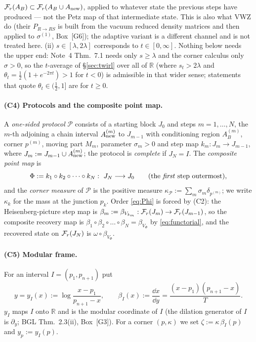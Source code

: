 \documentclass[11pt]{article}
\newcommand{\bI}{\beta_I}
\newcommand{\Fr}{\cF_r}
\newcommand{\PP}{\mathcal P}
\theoremstyle{definition}\newtheorem{example}[theorem]{Example}
\begin{document}
$\Fr(A_B)\subset\Fr(A_B\cup A_{\rm new})$, applied to whatever state the previous steps have
produced --- not the Petz map of that intermediate state.  This is also what VWZ do (their
$P_{R\to RS}$ is built from the vacuum reduced density matrices and then applied to
$\sigma^{(1)}$, Box~[G6]); the adaptive variant is a different channel and is not treated here.
(ii) $s\in[\lambda,2\lambda]$ corresponds to $t\in[0,\infty]$.  Nothing below needs the upper
end: Note~4 Thm.~7.1 needs only $s\ge\lambda$ and the corner calculus only $\sigma>0$, so the
$t$-average of \S\ref{sec:twirl} over all of $\mathbb R$ (where $s_t>2\lambda$ and
$\theta_t=\frac12(1+e^{-2\pi t})>1$ for $t<0$) is admissible in that wider sense; statements
that quote $\theta_t\in(\frac12,1]$ are for $t\ge0$.

\paragraph{(C4) Protocols and the composite point map.}
A \emph{one-sided protocol} $\PP$ consists of a starting block $J_0$ and steps
$m=1,\dots,N$, the $m$-th adjoining a chain interval $A^{(m)}_{\rm new}$ to $J_{m-1}$ with
conditioning region $A^{(m)}_B$, corner $p^{(m)}$, moving part $M_m$, parameter $\sigma_m>0$ and
step map $k_m:J_m\to J_{m-1}$, where $J_m:=J_{m-1}\cup A^{(m)}_{\rm new}$; the protocol is
\emph{complete} if $J_N=I$.  The \emph{composite point map} is
\begin{equation}\label{eq:Phi}
 \Phi:=k_1\circ k_2\circ\dots\circ k_N:\ J_N\longrightarrow J_0
 \qquad(\text{the \emph{first} step outermost}),
\end{equation}
and the \emph{corner measure} of $\PP$ is the positive measure
$\kappa_\PP:=\sum_m\sigma_m\delta_{p^{(m)}}$; we write $\kappa_k$ for the mass at the junction
$p_k$.  Order \eqref{eq:Phi} is forced by (C2): the Heisenberg-picture step map is
$\beta_m:=\beta_{V_{k_m}}:\Fr(J_m)\to\Fr(J_{m-1})$, so the composite recovery map is
$\beta_1\circ\beta_2\circ\dots\circ\beta_N=\beta_{V_\Phi}$ by \eqref{eq:functorial}, and the
recovered state on $\Fr(J_N)$ is $\omega\circ\beta_{V_\Phi}$.

\paragraph{(C5) Modular frame.}
For an interval $I=(p_1,p_{n+1})$ put
\begin{equation}\label{eq:modframe}
 y=y_I(x):=\log\frac{x-p_1}{p_{n+1}-x},\qquad
 \bI(x):=\frac{\dd x}{\dd y}=\frac{(x-p_1)(p_{n+1}-x)}{T} .
\end{equation}
$y_I$ maps $I$ onto $\mathbb R$ and is the modular coordinate of $I$ (the dilation generator of
$I$ is $\partial_y$; BGL \cite{BGL} Thm.~2.3(ii), Box~[G3]).  For a corner $(p,\kappa)$
we set $\zeta:=\kappa\,\bI(p)$ and $y_p:=y_I(p)$.
\end{document}

